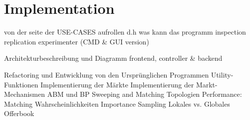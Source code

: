 \documentclass[Bachelorarbeit.tex]{subfiles}
\begin{document}
\chapter{Implementation}
von der seite der USE-CASES aufrollen d.h was kann das programm
	inspection
	replication
	experimenter (CMD & GUI version)
	
Architekturbeschreibung und Diagramm
	frontend, controller & backend
	
	Refactoring und Entwicklung von den Ursprünglichen Programmen
	Utility-Funktionen
	Implementierung der Märkte
	Implementierung der Markt-Mechanismen ABM und BP
	Sweeping and Matching 
	Topologien
	Performance:
		Matching Wahrscheinlichkeiten
		Importance Sampling
		Lokales vs. Globales Offerbook
\end{document}
